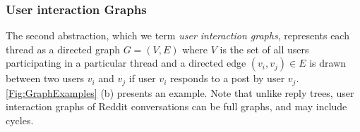 \subsubsection{User interaction Graphs} \label{sec:interaction_graphs}
The second abstraction, which we term \textit{user interaction graphs},  represents each thread as a directed graph $G = (V,E)$ where $V$ is the set of all users participating in a particular thread and a directed edge $(v_i, v_j) \in E$ is drawn between two users $v_i$ and $v_j$ if user $v_i$ responds to a post by user $v_j$. \ref{Fig:GraphExamples} (b) presents an example. Note that unlike reply trees, user interaction graphs of Reddit conversations can be full graphs, and may include cycles. %



